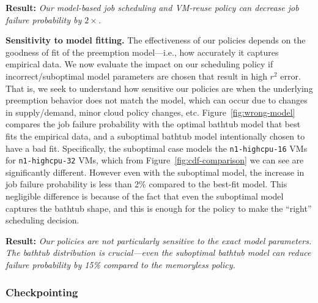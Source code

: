 \noindent \textbf{Result:} \emph{Our model-based job scheduling and VM-reuse policy can decrease job failure probability by $2\times$.}





\noindent \textbf{Sensitivity to model fitting.}
The effectiveness of our policies depends on the goodness of fit of the preemption model---i.e., how accurately it captures empirical data.
%
We now evaluate the impact on our scheduling policy if incorrect/suboptimal model parameters are chosen that result in high $r^2$ error. 
%
That is, we seek to understand how sensitive our policies are when the underlying preemption behavior does not match the model, which can occur due to changes in supply/demand, minor cloud policy changes, etc. 
%
Figure~\ref{fig:wrong-model} compares the job failure probability with the optimal bathtub model that best fits the empirical data, and a suboptimal  bathtub model intentionally chosen to have a bad fit. 
%
Specifically, the suboptimal case models the \texttt{n1-highcpu-16} VMs for \texttt{n1-highcpu-32} VMs, which from Figure~\ref{fig:cdf-comparison} we can see are significantly different.
%
However even with the suboptimal model, the increase in job failure probability is less than 2\% compared to the best-fit model. 
%
This negligible difference is because of the fact that even the suboptimal model captures the bathtub shape, and this is enough for the policy to make the ``right'' scheduling decision. 

\noindent \textbf{Result:} \emph{Our policies are not particularly sensitive to the exact model parameters. The bathtub distribution is crucial---even the suboptimal bathtub model can reduce failure probability by 15\% compared to the memoryless policy. }
%





\vspace*{\subsecspace}
\subsubsection{Checkpointing}
\label{subsec:eval-ckpt}

